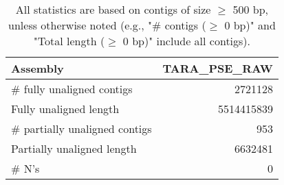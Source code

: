 \documentclass[12pt,a4paper]{article}
\begin{document}
\begin{table}[ht]
\begin{center}
\caption{All statistics are based on contigs of size $\geq$ 500 bp, unless otherwise noted (e.g., "\# contigs ($\geq$ 0 bp)" and "Total length ($\geq$ 0 bp)" include all contigs).}
\begin{tabular}{|l*{1}{|r}|}
\hline
Assembly & TARA\_PSE\_RAW \\ \hline
\# fully unaligned contigs & 2721128 \\ \hline
Fully unaligned length & 5514415839 \\ \hline
\# partially unaligned contigs & 953 \\ \hline
Partially unaligned length & 6632481 \\ \hline
\# N's & 0 \\ \hline
\end{tabular}
\end{center}
\end{table}
\end{document}
